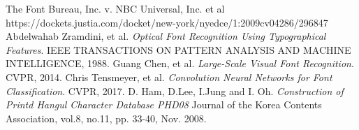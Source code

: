 \documentclass[%
 reprint,
nofootinbib,
nobibnotes,
amsmath,amssymb,
aps,
]{revtex4-1}
\begin{document}
\begin{thebibliography}{1}
 The Font Bureau, Inc. v. NBC Universal, Inc. et al\\
https://dockets.justia.com/docket/new-york/nyedce/1:2009cv04286/296847
 Abdelwahab Zramdini, et al. {\em Optical Font Recognition
  Using Typographical Features}.\/ IEEE TRANSACTIONS ON PATTERN ANALYSIS AND
    MACHINE INTELLIGENCE, 1988.
 Guang Chen, et al. {\em Large-Scale Visual Font Recognition}.
\/ CVPR, 2014.
 Chris Tensmeyer, et al. {\em Convolution Neural Networks
  for Font Classification}. CVPR, 2017.
 D. Ham, D.Lee, I.Jung and I. Oh. {\em Construction of Printd
  Hangul Character Database PHD08} Journal of the Korea Contents Association,
    vol.8, no.11, pp. 33-40, Nov. 2008.
\end{thebibliography}




\flushend
\end{document}

